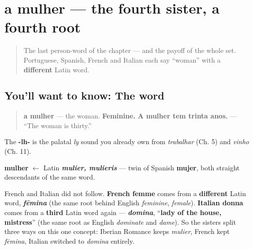 \section[a mulher]{a mulher — the fourth sister, a fourth root}

\label{lesson:PT-C25-mulher}



\begin{quote}
The last person-word of the chapter — and the payoff of the whole set. Portuguese, Spanish, French and Italian each say \textquotedblleft{}woman\textquotedblright{} with a \textbf{different} Latin word.
\end{quote}

\subsection*{You'll want to know: The word}
\begin{quote}
\textbf{a mulher} — the woman. \textbf{Feminine.} \textbf{A mulher tem trinta anos.} — \textquotedblleft{}The woman is thirty.\textquotedblright{}
\end{quote}

The \textbf{-lh-} is the palatal \emph{ly} sound you already own from \emph{trabalhar} (Ch. 5) and \emph{vinho} (Ch. 11).

\begin{cousinweb}
\textbf{mulher} $\leftarrow$ Latin \emph{\textbf{mulier, mulieris}} — twin of Spanish \textbf{mujer}, both straight descendants of the same word.

French and Italian did not follow. \textbf{French femme} comes from a \textbf{different} Latin word, \emph{\textbf{fēmina}} (the same root behind English \emph{feminine}, \emph{female}). \textbf{Italian donna} comes from a \textbf{third} Latin word again — \emph{\textbf{domina}}, \textquotedblleft{}\textbf{lady of the house, mistress}\textquotedblright{} (the same root as English \emph{dominate} and \emph{dame}). So the sisters split three ways on this one concept: Iberian Romance keeps \emph{mulier}, French kept \emph{fēmina}, Italian switched to \emph{domina} entirely.
\end{cousinweb}

